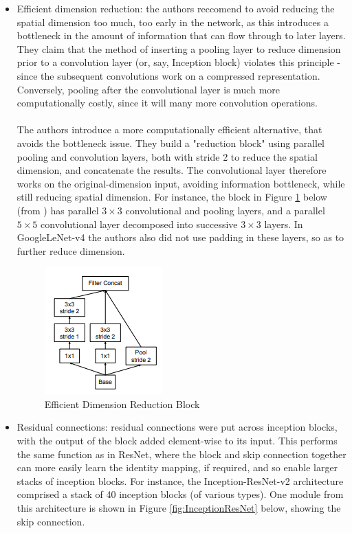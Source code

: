 \documentclass[11pt]{article} %
\theoremstyle{plain}
\theoremstyle{definition}
\begin{document}
\begin{itemize}
    \item Efficient dimension reduction: the authors reccomend to avoid reducing the spatial dimension too much, too early in the network, as this introduces a bottleneck in the amount of information that can flow through to later layers. They claim that the method of inserting a pooling layer to reduce dimension prior to a convolution layer (or, say, Inception block) violates this principle - since the subsequent convolutions work on a compressed representation. Conversely, pooling after the convolutional layer is much more computationally costly, since it will many more convolution operations. 
    \\
    \\
    \noindent
    The authors introduce a more computationally efficient alternative, that avoids the bottleneck issue. They build a "reduction block" using parallel pooling and convolution layers, both with stride 2 to reduce the spatial dimension, and concatenate the results. The convolutional layer therefore works on the original-dimension input, avoiding information bottleneck, while still reducing spatial dimension. For instance, the block in Figure \ref{fig:EfficientSpatialReductionBlock} below (from \cite{GoogLeNet_v3_Paper}) has parallel \(3 \times 3\) convolutional and pooling layers, and a parallel \(5 \times 5\) convolutional layer decomposed into successive \(3 \times 3\) layers. In GoogleLeNet-v4 the authors also did not use padding in these layers, so as to further reduce dimension.
    \begin{figure}[!ht]
        \centering    
        \caption{Efficient Dimension Reduction Block}
        \label{fig:EfficientSpatialReductionBlock}
        \includegraphics[scale=0.7]{EfficientSpatialReductionBlock.PNG}
    \end{figure}
    \item Residual connections: residual connections were put across inception blocks, with the output of the block added element-wise to its input. This performs the same function as in ResNet, where the block and skip connection together can more easily learn the identity mapping, if required, and so enable larger stacks of inception blocks. For instance, the Inception-ResNet-v2 architecture comprised a stack of 40 inception blocks (of various types). One module from this architecture is shown in Figure \ref{fig:InceptionResNet} below, showing the skip connection.

\end{itemize}
\end{document}
